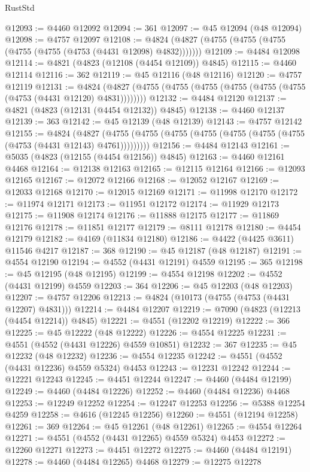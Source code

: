 \begin{lexlean}{RustStd}
\begin{coremodule}
@12093 := @4460 @12092
@12094 := 361
@12097 := @45 @12094 (@48 @12094)
@12098 := @4757 @12097
@12108 := @4824 (@4827 (@4755 (@4755 (@4755 (@4755 (@4755 (@4753 (@4431 @12098) @4832)))))))
@12109 := @4484 @12098
@12114 := @4821 (@4823 (@12108 (@4454 @12109)) @4845)
@12115 := @4460 @12114
@12116 := 362
@12119 := @45 @12116 (@48 @12116)
@12120 := @4757 @12119
@12131 := @4824 (@4827 (@4755 (@4755 (@4755 (@4755 (@4755 (@4755 (@4753 (@4431 @12120) @4831))))))))
@12132 := @4484 @12120
@12137 := @4821 (@4823 (@12131 (@4454 @12132)) @4845)
@12138 := @4460 @12137
@12139 := 363
@12142 := @45 @12139 (@48 @12139)
@12143 := @4757 @12142
@12155 := @4824
    (@4827 (@4755 (@4755 (@4755 (@4755 (@4755 (@4755 (@4755 (@4753 (@4431 @12143) @4761)))))))))
@12156 := @4484 @12143
@12161 := @5035 (@4823 (@12155 (@4454 @12156)) @4845)
@12163 := @4460 @12161 @4468
@12164 := @12138 @12163
@12165 := @12115 @12164
@12166 := @12093 @12165
@12167 := @12072 @12166
@12168 := @12052 @12167
@12169 := @12033 @12168
@12170 := @12015 @12169
@12171 := @11998 @12170
@12172 := @11974 @12171
@12173 := @11951 @12172
@12174 := @11929 @12173
@12175 := @11908 @12174
@12176 := @11888 @12175
@12177 := @11869 @12176
@12178 := @11851 @12177
@12179 := @8111 @12178
@12180 := @4454 @12179
@12182 := @4169 (@11834 @12180)
@12186 := @4422 (@4425 @3611) @11546 @4217
@12187 := 368
@12190 := @45 @12187 (@48 @12187)
@12191 := @4554 @12190
@12194 := @4552 (@4431 @12191) @4559
@12195 := 365
@12198 := @45 @12195 (@48 @12195)
@12199 := @4554 @12198
@12202 := @4552 (@4431 @12199) @4559
@12203 := 364
@12206 := @45 @12203 (@48 @12203)
@12207 := @4757 @12206
@12213 := @4824 (@10173 (@4755 (@4753 (@4431 @12207) @4831)))
@12214 := @4484 @12207
@12219 := @7090 (@4823 (@12213 (@4454 @12214)) @4845)
@12221 := @4551 (@12202 @12219)
@12222 := 366
@12225 := @45 @12222 (@48 @12222)
@12226 := @4554 @12225
@12231 := @4551 (@4552 (@4431 @12226) @4559 @10851)
@12232 := 367
@12235 := @45 @12232 (@48 @12232)
@12236 := @4554 @12235
@12242 := @4551 (@4552 (@4431 @12236) @4559 @5324) @4453
@12243 := @12231 @12242
@12244 := @12221 @12243
@12245 := @4451 @12244
@12247 := @4460 (@4484 @12199)
@12249 := @4460 (@4484 @12226)
@12252 := @4460 (@4484 @12236) @4468
@12253 := @12249 @12252
@12254 := @12247 @12253
@12256 := @5388 @12254 @4259
@12258 := @4616 (@12245 @12256)
@12260 := @4551 (@12194 @12258)
@12261 := 369
@12264 := @45 @12261 (@48 @12261)
@12265 := @4554 @12264
@12271 := @4551 (@4552 (@4431 @12265) @4559 @5324) @4453
@12272 := @12260 @12271
@12273 := @4451 @12272
@12275 := @4460 (@4484 @12191)
@12278 := @4460 (@4484 @12265) @4468
@12279 := @12275 @12278

\end{coremodule}
\end{lexlean}
